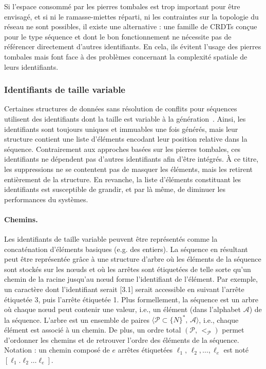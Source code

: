 Si l'espace consommé par les pierres tombales est trop important pour être
envisagé, et si ni le ramasse-miettes réparti, ni les contraintes sur la
topologie du réseau ne sont possibles, il existe une alternative : une famille
de CRDTs conçue pour le type séquence et dont le bon fonctionnement ne nécessite
pas de référencer directement d'autres identifiants. En cela, ils évitent
l'usage des pierres tombales mais font face à des problèmes concernant la
complexité spatiale de leurs identifiants.

\subsubsection{Identifiants de taille variable}

Certaines structures de données sans résolution de conflits pour séquences
utilisent des identifiants dont la taille est variable à la
génération~\cite{andre2013supporting, preguica2009commutative,
  weiss2009logoot}. Ainsi, les identifiants sont toujours uniques et immuables
une fois générés, mais leur structure contient une liste d'éléments encodant
leur position relative dans la séquence.  Contrairement aux approches basées sur
les pierres tombales, ces identifiants ne dépendent pas d'autres identifiants
afin d'être intégrés. À ce titre, les suppressions ne se contentent pas de
masquer les éléments, mais les retirent entièrement de la structure. En
revanche, la liste d'éléments constituant les identifiants est susceptible de
grandir, et par là même, de diminuer les performances du systèmes.


\paragraph{Chemins.}

Les identifiants de taille variable peuvent être représentés comme la
concaténation d'éléments basiques (e.g. des entiers). La séquence en résultant
peut être représentée grâce à une structure d'arbre où les éléments de la
séquence sont stockés sur les nœuds et où les arrêtes sont étiquetées de telle
sorte qu'un chemin de la racine jusqu'au nœud forme l'identifiant de
l'élément. Par exemple, un caractère dont l'identifiant serait [3.1] serait
accessible en suivant l'arrête étiquetée 3, puis l'arrête étiquetée 1. Plus
formellement, la séquence est un arbre où chaque nœud peut contenir une valeur,
i.e., un élément (dans l'alphabet $\mathcal{A}$) de la séquence. L'arbre est un
ensemble de paires $\langle \mathcal{P}\subset \{N\}^*,\, \mathcal{A} \rangle$,
i.e., chaque élément est associé à un chemin. De plus, un ordre total
$(\mathcal{P},\, <_\mathcal{P})$ permet d'ordonner les chemins et de retrouver
l'ordre des éléments de la séquence. Notation : un chemin composé de $e$ arrêtes
étiquetées $\ell_1,\,\ell_2,\ldots,\ell_e$ est noté
$[\ell_1.\ell_2\ldots\ell_e]$.

